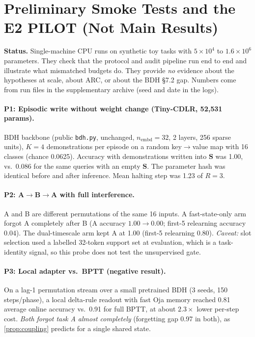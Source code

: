\documentclass[10pt]{article}
\theoremstyle{remark}
\newcommand{\Sm}{\mathbf{S}}
\newcommand{\cdlr}{\textsc{CDLR}}
\begin{document}
\section{Preliminary Smoke Tests and the E2 PILOT (Not Main Results)}
\label{app:probes}

\textbf{Status.} Single-machine CPU runs on synthetic toy tasks with $5\times10^4$ to $1.6\times10^6$ parameters. They
check that the protocol and audit pipeline run end to end and illustrate what mismatched budgets do. They provide
\emph{no} evidence about the hypotheses at scale, about ARC, or about the BDH \S7.2 gap. Numbers come from run files
in the supplementary archive (seed and date in the logs).

\paragraph{P1: Episodic write without weight change (Tiny-\cdlr, 52,531 params).} BDH backbone (public
\texttt{bdh.py}, unchanged, $n_{\text{embd}}{=}32$, 2 layers, 256 sparse units), $K{=}4$ demonstrations per episode on a
random key$\to$value map with 16 classes (chance 0.0625). Accuracy with demonstrations written into $\Sm$ was 1.00,
vs.\ 0.086 for the same queries with an empty $\Sm$. The parameter hash was identical before and after inference.
Mean halting step was 1.23 of $R{=}3$.

\paragraph{P2: A$\to$B$\to$A with full interference.} A and B are different permutations of the same 16 inputs. A
fast-state-only arm forgot A completely after B (A accuracy $1.00\to0.00$; first-5 relearning accuracy 0.04). The
dual-timescale arm kept A at 1.00 (first-5 relearning 0.80). \emph{Caveat:} slot selection used a labelled 32-token
support set at evaluation, which is a task-identity signal, so this probe does not test the unsupervised gate.

\paragraph{P3: Local adapter vs.\ BPTT (negative result).} On a lag-1 permutation stream over a small pretrained BDH
(3 seeds, 150 steps/phase), a local delta-rule readout with fast Oja memory reached 0.81 average online accuracy vs.\
0.91 for full BPTT, at about $2.3\times$ lower per-step cost. \emph{Both forgot task A almost completely} (forgetting gap
0.97 in both), as \cref{prop:coupling} predicts for a single shared state.
\end{document}
